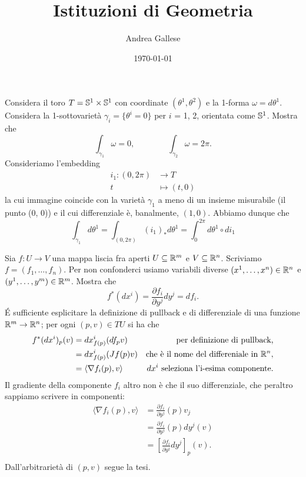 \documentclass[a4paper]{article}
\title{Istituzioni di Geometria}\let\Title\@title
\author{Andrea Gallese}\let\Author\@author
\date{\today}\let\Date\@date
\begin{document}
	\Intitola
	
\begin{ex}[6.2]{Considera il toro $T = \S^1 \times \S^1 $ con coordinate $ (\theta^1, \theta^2) $ e la 1-forma $ \omega = d\theta^1 $. Considera la 1-sottovarietà $ \gamma_i  = \{\theta^i = 0 \} $ per $ i $ = 1, 2, orientata come $ \S^1 $. Mostra che \[\int_{\gamma_1} \omega =0, \qquad\qquad \int_{\gamma_2} \omega =2\pi.  \] }
	Consideriamo l'embedding
	\begin{align*}
		i_1 \colon (0, 2\pi) & \to T \\
		t &\mapsto (t, 0)
	\end{align*}
	la cui immagine coincide con la varietà $ \gamma_1 $ a meno di un insieme misurabile (il punto (0, 0)) e il cui differenziale è, banalmente, $ (1, 0) $. Abbiamo dunque che
	\[ \int_{\gamma_1} d\theta^1 = \int_{(0, 2\pi)} (i_1)_*d\theta^1 = \int_0^{2\pi} d\theta^1 \circ di_1 \]
	
\end{ex}

\begin{ex}[6.3]{Sia $ f \colon U \to V $ una mappa liscia fra aperti $ U \subseteq \R^m $ e $ V \subseteq \R^n $. Scriviamo $ f = (f_1, \dots, f_n). $ Per non confonderci usiamo variabili diverse
		$ (x^1, \dots, x^n) \in \R^n$
		e $ (y^1, \dots, y^	m) \in \R^m$. Mostra che
		\[ f^*(dx^i)= \frac{\partial f_i}{\partial y^j}dy^j = df_i. \]}
	É sufficiente esplicitare la definizione di pullback e di differenziale di una funzione $\R^m \to \R^n$; per ogni $(p, v) \in TU$ si ha che
	\begin{align*}
		f^\ast(dx^i)_p(v) & = dx^i_{f(p)}(df_pv)
		& \text{per definizione di pullback,} \\
		& = dx^i_{f(p)}(Jf(p)v)
		& \text{che è il nome del differeniale in } \R^n, \\
		& = \langle \nabla f_i(p), v  \rangle
		& dx^i\text{ seleziona l'i-esima componente}.
	\end{align*}
	Il gradiente della componente $f_i$ altro non è che il suo differenziale, che peraltro sappiamo scrivere in componenti:
	\begin{align*}
	\langle \nabla f_i(p), v  \rangle & = \frac{\partial f_i}{\partial y^j}(p)v_j \\
	&= \frac{\partial f_i}{\partial y^j}(p)dy^j(v) \\
	&= \left[\frac{\partial f_i}{\partial y^j}dy^j\right]_p(v). \\
	\end{align*}
	Dall'arbitrarietà di $ (p, v) $ segue la tesi.
\end{ex}
\end{document}
